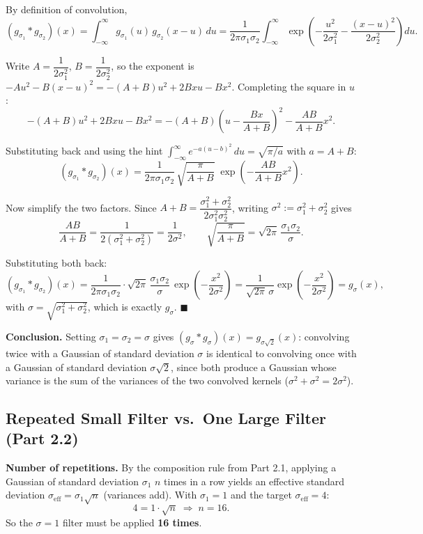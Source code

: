\documentclass[11pt]{article}
\begin{document}
By definition of convolution,
\[
(g_{\sigma_1} * g_{\sigma_2})(x) = \int_{-\infty}^{\infty} g_{\sigma_1}(u)\, g_{\sigma_2}(x-u)\, du
= \frac{1}{2\pi\sigma_1\sigma_2} \int_{-\infty}^{\infty} \exp\!\left(-\frac{u^2}{2\sigma_1^2} - \frac{(x-u)^2}{2\sigma_2^2}\right) du.
\]

Write $A = \dfrac{1}{2\sigma_1^2}$, $B = \dfrac{1}{2\sigma_2^2}$, so the exponent is
$-Au^2 - B(x-u)^2 = -(A+B)u^2 + 2Bxu - Bx^2$.
Completing the square in $u$:
\[
-(A+B)u^2 + 2Bxu - Bx^2 = -(A+B)\left(u - \frac{Bx}{A+B}\right)^2 - \frac{AB}{A+B}x^2.
\]

Substituting back and using the hint $\int_{-\infty}^{\infty} e^{-a(u-b)^2}\,du = \sqrt{\pi/a}$ with $a = A+B$:
\[
(g_{\sigma_1} * g_{\sigma_2})(x) = \frac{1}{2\pi\sigma_1\sigma_2}\, \sqrt{\frac{\pi}{A+B}}\; \exp\!\left(-\frac{AB}{A+B}x^2\right).
\]

Now simplify the two factors. Since $A+B = \dfrac{\sigma_1^2+\sigma_2^2}{2\sigma_1^2\sigma_2^2}$, writing $\sigma^2 := \sigma_1^2+\sigma_2^2$ gives
\[
\frac{AB}{A+B} = \frac{1}{2(\sigma_1^2+\sigma_2^2)} = \frac{1}{2\sigma^2},
\qquad
\sqrt{\frac{\pi}{A+B}} = \sqrt{2\pi}\,\frac{\sigma_1\sigma_2}{\sigma}.
\]

Substituting both back:
\[
(g_{\sigma_1} * g_{\sigma_2})(x) = \frac{1}{2\pi\sigma_1\sigma_2}\cdot \sqrt{2\pi}\,\frac{\sigma_1\sigma_2}{\sigma}\, \exp\!\left(-\frac{x^2}{2\sigma^2}\right)
= \frac{1}{\sqrt{2\pi}\,\sigma}\exp\!\left(-\frac{x^2}{2\sigma^2}\right) = g_\sigma(x),
\]
with $\sigma = \sqrt{\sigma_1^2+\sigma_2^2}$, which is exactly $g_\sigma$. $\blacksquare$

\textbf{Conclusion.} Setting $\sigma_1 = \sigma_2 = \sigma$ gives $(g_\sigma * g_\sigma)(x) = g_{\sigma\sqrt{2}}(x)$: convolving twice with a Gaussian of standard deviation $\sigma$ is identical to convolving once with a Gaussian of standard deviation $\sigma\sqrt{2}$, since both produce a Gaussian whose variance is the sum of the variances of the two convolved kernels ($\sigma^2+\sigma^2 = 2\sigma^2$).

\subsection{Repeated Small Filter vs.\ One Large Filter (Part 2.2)}

\textbf{Number of repetitions.} By the composition rule from Part 2.1, applying a Gaussian of standard deviation $\sigma_1$ $n$ times in a row yields an effective standard deviation $\sigma_{\text{eff}} = \sigma_1\sqrt{n}$ (variances add). With $\sigma_1 = 1$ and the target $\sigma_{\text{eff}} = 4$:
\[
4 = 1\cdot\sqrt{n} \;\Longrightarrow\; n = 16.
\]
So the $\sigma=1$ filter must be applied \textbf{16 times}.
\end{document}
